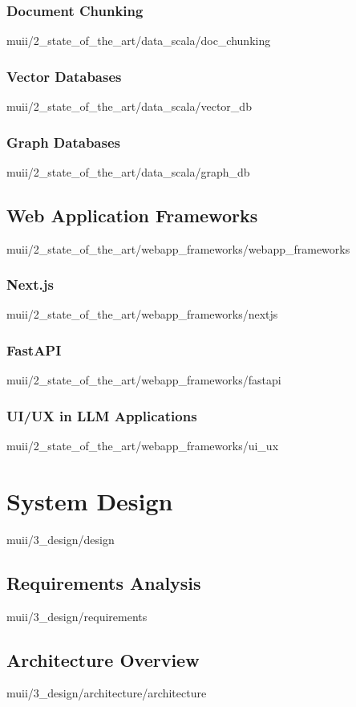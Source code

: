 \documentclass[english,epsbased,copyright,final,printable,covers,extendedindex,firstnumbered,tfm,gnuplot,loc,loe,lof,lot]{tfgtfmthesisuam}
\begin{document}
      \subsection{Document Chunking\label{SS:CHUNKING}}{muii/2_state_of_the_art/data_scala/doc_chunking}
      \subsection{Vector Databases\label{SS:VECTORSTORE}}{muii/2_state_of_the_art/data_scala/vector_db}
      \subsection{Graph Databases\label{SS:GRAPHDB}}{muii/2_state_of_the_art/data_scala/graph_db}

    \section{Web Application Frameworks\label{SEC:WEBAPP_FRAMEWORKS}}{muii/2_state_of_the_art/webapp_frameworks/webapp_frameworks}
      \subsection{Next.js\label{SS:NEXTJS}}{muii/2_state_of_the_art/webapp_frameworks/nextjs}
      \subsection{FastAPI\label{SS:FASTAPI}}{muii/2_state_of_the_art/webapp_frameworks/fastapi}
      \subsection{UI/UX in LLM Applications\label{SS:USER_INTERFACE}}{muii/2_state_of_the_art/webapp_frameworks/ui_ux}

  \chapter{System Design\label{CAP:DESIGN}}{muii/3_design/design}
    \section{Requirements Analysis\label{SEC:REQUIREMENTS}}{muii/3_design/requirements}

    \section{Architecture Overview\label{SEC:ARCH}}{muii/3_design/architecture/architecture}
\end{document}
